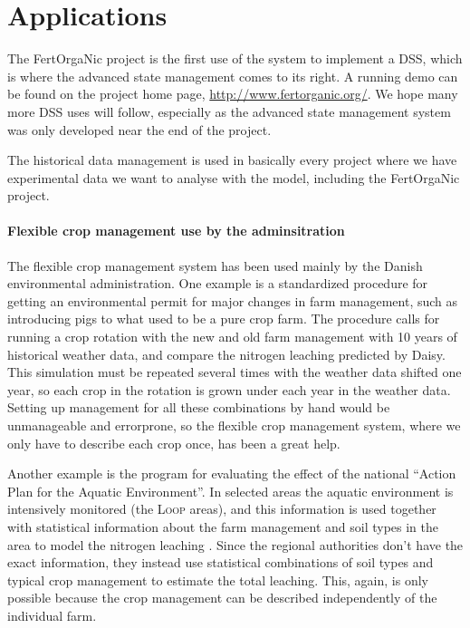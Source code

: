 \documentclass[a4paper]{article}
\begin{document}
\section{Applications}

The FertOrgaNic project is the first use of the system to implement a
DSS, which is where the advanced state management comes to its right.
A running demo can be found on the project home page,
\url{http://www.fertorganic.org/}.  We hope many more DSS uses will
follow, especially as the advanced state management system was only
developed near the end of the project.

The historical data management is used in basically every project
where we have experimental data we want to analyse with the model,
including the FertOrgaNic project.

\paragraph{Flexible crop management use by the adminsitration} The
flexible crop management system has been used mainly by the Danish
environmental administration.  One example is a standardized procedure
\cite{daisy-staabi} for getting an environmental permit for major
changes in farm management, such as introducing pigs to what used to
be a pure crop farm.  The procedure calls for running a crop rotation
with the new and old farm management with 10 years of historical
weather data, and compare the nitrogen leaching predicted by Daisy.
This simulation must be repeated several times with the weather data
shifted one year, so each crop in the rotation is grown under each
year in the weather data.  Setting up management for all these
combinations by hand would be unmanageable and errorprone, so the
flexible crop management system, where we only have to describe each
crop once, has been a great help.

Another example is the program for evaluating the effect of the
national ``Action Plan for the Aquatic Environment''.  In selected
areas the aquatic environment is intensively monitored (the
\textsc{Loop} areas), and this information is used together with
statistical information about the farm management and soil types in
the area to model the nitrogen leaching \cite{novana}.  Since the
regional authorities don't have the exact information, they instead
use statistical combinations of soil types and typical crop management
to estimate the total leaching.  This, again, is only possible because
the crop management can be described independently of the individual
farm.
\end{document}
